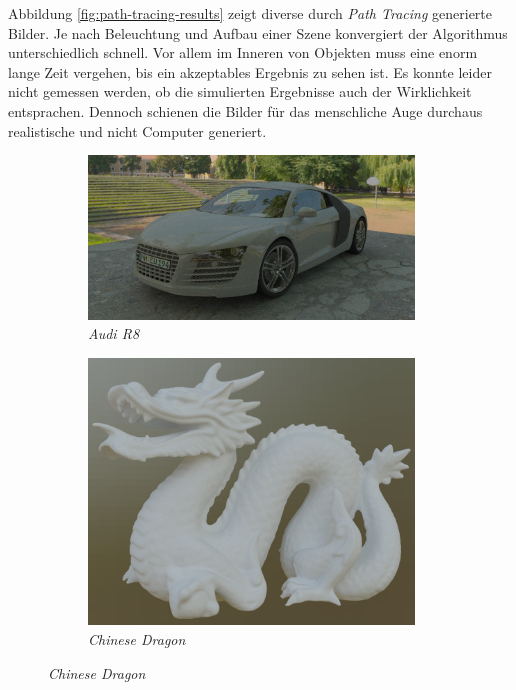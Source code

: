 \documentclass[crop=false]{standalone}
\begin{document}
      Abbildung \ref{fig:path-tracing-results} zeigt diverse durch \textit{Path Tracing} generierte Bilder.
      Je nach Beleuchtung und Aufbau einer Szene konvergiert der Algorithmus unterschiedlich schnell.
      Vor allem im Inneren von Objekten muss eine enorm lange Zeit vergehen, bis ein akzeptables Ergebnis zu sehen ist.
      Es konnte leider nicht gemessen werden, ob die simulierten Ergebnisse auch der Wirklichkeit entsprachen.
      Dennoch schienen die Bilder für das menschliche Auge durchaus realistische und nicht Computer generiert.
      \begin{figure}[h]
        \center
        \begin{subfigure}[b]{0.614\textwidth}
          \center
          \includegraphics[width=0.95\textwidth]{images/path_tracing-audi_r8.png}
          \caption{\textit{Audi R8}}
        \end{subfigure}
        \begin{subfigure}[b]{0.38\textwidth}
          \center
          \includegraphics[width=0.95\textwidth]{images/path_tracing-dragon.png}
          \caption{\textit{Chinese Dragon}}
        \end{subfigure}


\end{figure}
\end{document}
